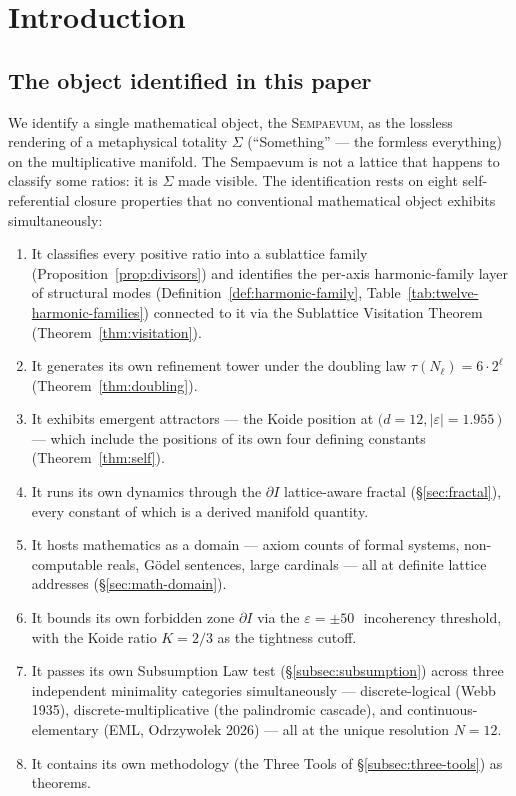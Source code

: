 \documentclass[11pt,a4paper]{article}
\theoremstyle{definition}
\theoremstyle{remark}
\newcommand{\Sempaevum}{\textsc{Sempaevum}}
\begin{document}
\tableofcontents

\section{Introduction}

\subsection{The object identified in this paper}

We identify a single mathematical object, the \Sempaevum, as the lossless rendering of a metaphysical totality $\Sigma$ (``Something'' --- the formless everything) on the multiplicative manifold. The Sempaevum is not a lattice that happens to classify some ratios: it is $\Sigma$ made visible. The identification rests on eight self-referential closure properties that no conventional mathematical object exhibits simultaneously:

\begin{enumerate}[leftmargin=*]
\item It classifies every positive ratio into a sublattice family (Proposition~\ref{prop:divisors}) and identifies the per-axis harmonic-family layer of structural modes (Definition~\ref{def:harmonic-family}, Table~\ref{tab:twelve-harmonic-families}) connected to it via the Sublattice Visitation Theorem (Theorem~\ref{thm:visitation}).
\item It generates its own refinement tower under the doubling law $\tau(N_{\ell}) = 6\cdot 2^{\ell}$ (Theorem~\ref{thm:doubling}).
\item It exhibits emergent attractors --- the Koide position at $(d=12, |\varepsilon|=1.955$\,\textcent $)$ --- which include the positions of its own four defining constants (Theorem~\ref{thm:self}).
\item It runs its own dynamics through the $\partial I$ lattice-aware fractal (\S\ref{sec:fractal}), every constant of which is a derived manifold quantity.
\item It hosts mathematics as a domain --- axiom counts of formal systems, non-computable reals, G\"odel sentences, large cardinals --- all at definite lattice addresses (\S\ref{sec:math-domain}).
\item It bounds its own forbidden zone $\partial I$ via the $\varepsilon=\pm 50$\,\textcent\ incoherency threshold, with the Koide ratio $K=2/3$ as the tightness cutoff.
\item It passes its own Subsumption Law test (\S\ref{subsec:subsumption}) across three independent minimality categories simultaneously --- discrete-logical (Webb 1935), discrete-multiplicative (the palindromic cascade), and continuous-elementary (EML, Odrzywo{\l}ek 2026) --- all at the unique resolution $N=12$.
\item It contains its own methodology (the Three Tools of \S\ref{subsec:three-tools}) as theorems.
\end{enumerate}
\end{document}
